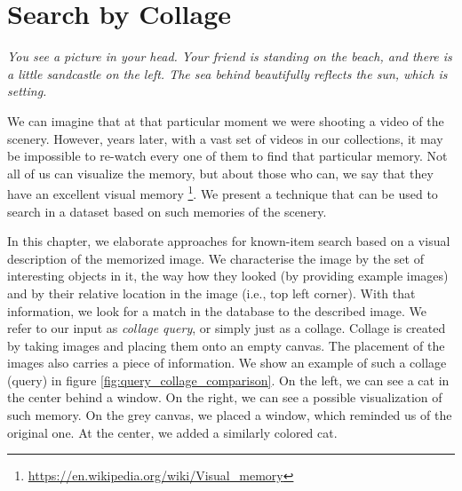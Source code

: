 
\chapter{Search by Collage}
\label{ch:object_location}


\normalem
\emph{You see a picture in your head. Your friend is standing on the beach, and there is a little sandcastle on the left. The sea behind beautifully reflects the sun, which is setting.}
\ULforem

We can imagine that at that particular moment we were shooting a video of the scenery. However, years later, with a vast set of videos in our collections, it may be impossible to re-watch every one of them to find that particular memory. Not all of us can visualize the memory, but about those who can, we say that they have an excellent visual memory \footnote{\url{https://en.wikipedia.org/wiki/Visual_memory}}. We present a technique that can be used to search in a dataset based on such memories of the scenery.

In this chapter, we elaborate approaches for known-item search based on a visual description of the memorized image. We characterise the image by the set of interesting objects in it, the way how they looked (by providing example images) and by their relative location in the image (i.e., top left corner). With that information, we look for a match in the database to the described image. We refer to our input as \emph{collage query}, or simply just as a collage. Collage is created by taking images and placing them onto an empty canvas. The placement of the images also carries a piece of information. We show an example of such a collage (query) in figure \ref{fig:query_collage_comparison}. On the left, we can see a cat in the center behind a window. On the right, we can see a possible visualization of such memory. On the grey canvas, we placed a window, which reminded us of the original one. At the center, we added a similarly colored cat.

